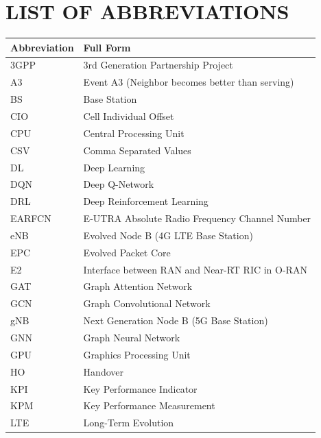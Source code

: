\documentclass[12pt,a4paper,oneside]{report}
\begin{document}
\renewcommand{\listfigurename}{LIST OF FIGURES}
\listoffigures
\clearpage

\renewcommand{\listtablename}{LIST OF TABLES}
\listoftables
\clearpage

\chapter*{LIST OF ABBREVIATIONS}

\begin{center}
\begin{tabular}{ll}
\toprule
\textbf{Abbreviation} & \textbf{Full Form}\\
\midrule
3GPP        & 3rd Generation Partnership Project\\
A3          & Event A3 (Neighbor becomes better than serving)\\
BS          & Base Station\\
CIO         & Cell Individual Offset\\
CPU         & Central Processing Unit\\
CSV         & Comma Separated Values\\
DL          & Deep Learning\\
DQN         & Deep Q-Network\\
DRL         & Deep Reinforcement Learning\\
EARFCN      & E-UTRA Absolute Radio Frequency Channel Number\\
eNB         & Evolved Node B (4G LTE Base Station)\\
EPC         & Evolved Packet Core\\
E2          & Interface between RAN and Near-RT RIC in O-RAN\\
GAT         & Graph Attention Network\\
GCN         & Graph Convolutional Network\\
gNB         & Next Generation Node B (5G Base Station)\\
GNN         & Graph Neural Network\\
GPU         & Graphics Processing Unit\\
HO          & Handover\\
KPI         & Key Performance Indicator\\
KPM         & Key Performance Measurement\\
LTE         & Long-Term Evolution\\

\end{tabular}
\end{center}
\end{document}
